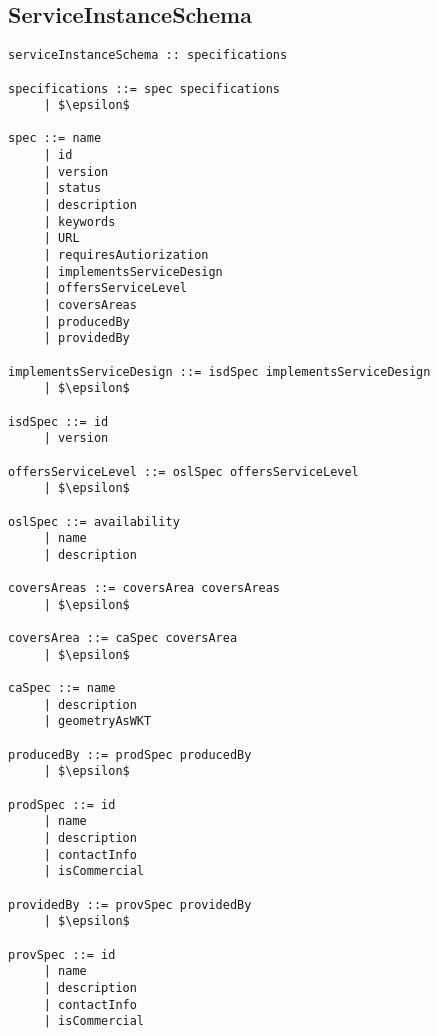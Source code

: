 \subsection{ServiceInstanceSchema}
\begin{lstlisting}[mathescape=true, keywordstyle={}]
serviceInstanceSchema :: specifications

specifications ::= spec specifications
     | $\epsilon$

spec ::= name
     | id
     | version
     | status
     | description
     | keywords
     | URL
     | requiresAutiorization
     | implementsServiceDesign
     | offersServiceLevel
     | coversAreas
     | producedBy
     | providedBy

implementsServiceDesign ::= isdSpec implementsServiceDesign
     | $\epsilon$

isdSpec ::= id
     | version

offersServiceLevel ::= oslSpec offersServiceLevel
     | $\epsilon$

oslSpec ::= availability
     | name
     | description

coversAreas ::= coversArea coversAreas
     | $\epsilon$

coversArea ::= caSpec coversArea
     | $\epsilon$

caSpec ::= name
     | description
     | geometryAsWKT

producedBy ::= prodSpec producedBy
     | $\epsilon$

prodSpec ::= id
     | name
     | description
     | contactInfo
     | isCommercial
     
providedBy ::= provSpec providedBy
     | $\epsilon$

provSpec ::= id
     | name
     | description
     | contactInfo
     | isCommercial
\end{lstlisting}